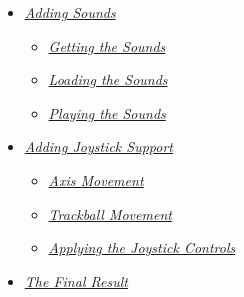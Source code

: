 \documentclass[letterpaper,10pt,english]{sphinxmanual}
\begin{document}
{\begin{minipage}{0.95\linewidth}
\begin{itemize}
\begin{itemize}
\begin{itemize}
\end{itemize}

\item {} 
\label{pong_better:id10}{\hyperref[pong_better:adding\string-sounds]{\emph{Adding Sounds}}}
\begin{itemize}
\item {} 
\label{pong_better:id11}{\hyperref[pong_better:getting\string-the\string-sounds]{\emph{Getting the Sounds}}}

\item {} 
\label{pong_better:id12}{\hyperref[pong_better:loading\string-the\string-sounds]{\emph{Loading the Sounds}}}

\item {} 
\label{pong_better:id13}{\hyperref[pong_better:playing\string-the\string-sounds]{\emph{Playing the Sounds}}}

\end{itemize}

\item {} 
\label{pong_better:id14}{\hyperref[pong_better:adding\string-joystick\string-support]{\emph{Adding Joystick Support}}}
\begin{itemize}
\item {} 
\label{pong_better:id15}{\hyperref[pong_better:axis\string-movement]{\emph{Axis Movement}}}

\item {} 
\label{pong_better:id16}{\hyperref[pong_better:trackball\string-movement]{\emph{Trackball Movement}}}

\item {} 
\label{pong_better:id17}{\hyperref[pong_better:applying\string-the\string-joystick\string-controls]{\emph{Applying the Joystick Controls}}}

\end{itemize}

\item {} 
\label{pong_better:id18}{\hyperref[pong_better:the\string-final\string-result]{\emph{The Final Result}}}

\end{itemize}

\end{itemize}
\end{minipage}}
\begin{center}\setlength{\fboxsep}{5pt}\end{center}
\end{document}
